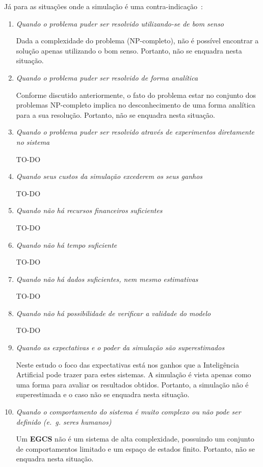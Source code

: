 Já para as situações onde a simulação é uma contra-indicação~\cite{Banks}:

\begin{enumerate}
\item \textit{Quando o problema puder ser resolvido utilizando-se de bom senso}

Dada a complexidade do problema (NP-completo), não é possível encontrar a
solução apenas utilizando o bom senso. Portanto, não se enquadra nesta situação.

\item \textit{Quando o problema puder ser resolvido de forma analítica}

Conforme discutido anteriormente, o fato do problema estar no conjunto dos
problemas NP-completo implica no desconhecimento de uma forma analítica para a
sua resolução. Portanto, não se enquadra nesta situação.

\item \textit{Quando o problema puder ser resolvido através de experimentos
      diretamente no sistema}

      TO-DO %

\item \textit{Quando seus custos da simulação excederem os seus ganhos}

      TO-DO %

\item \textit{Quando não há recursos financeiros suficientes}

      TO-DO %

\item \textit{Quando não há tempo suficiente}

      TO-DO %

\item \textit{Quando não há dados suficientes, nem mesmo estimativas}

      TO-DO %

\item \textit{Quando não há possibilidade de verificar a validade do modelo}

      TO-DO %

\item \textit{Quando as expectativas e o poder da simulação são superestimados}

Neste estudo o foco das expectativas está nos ganhos que a Inteligência
Artificial pode trazer para estes sistemas. A simulação é vista apenas como uma
forma para avaliar os resultados obtidos. Portanto, a simulação não é
superestimada e o caso não se enquadra nesta situação.

\item \textit{Quando o comportamento do sistema é muito complexo ou não pode ser
      definido (e.~g. seres humanos)}

Um \textbf{EGCS} não é um sistema de alta complexidade, possuindo um conjunto de
comportamentos limitado e um espaço de estados finito. Portanto, não se enquadra
nesta situação.

\end{enumerate}

